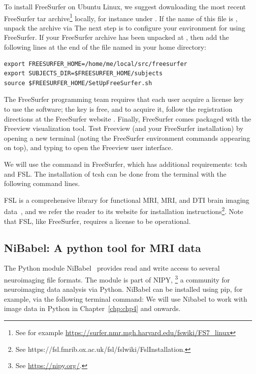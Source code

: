 To install FreeSurfer on Ubuntu Linux, we suggest downloading the most
recent FreeSurfer tar archive\footnote{See for example \url{https://surfer.nmr.mgh.harvard.edu/fswiki/FS7\_linux}}
locally, for instance under . If the name of this
file is , unpack the archive via
\noindent The next step is to configure your environment for using
FreeSurfer. If your FreeSurfer archive has been unpacked at
, then add the following lines
at the end of the file named  in your home
directory:
\begin{lstlisting}[style=bashStyle]
export FREESURFER_HOME=/home/me/local/src/freesurfer 
export SUBJECTS_DIR=$FREESURFER_HOME/subjects 
source $FREESURFER_HOME/SetUpFreeSurfer.sh
\end{lstlisting}

\noindent The {FreeSurfer} programming team requires that each user
acquire a license key to use the software; the key is free,
and to acquire it, follow the registration directions at the FreeSurfer
website \cite{freesurfer}. Finally, FreeSurfer comes packaged
with the Freeview visualization tool. Test Freeview (and your
FreeSurfer installation) by opening a new terminal (noting the
FreeSurfer environment commands appearing on top), and typing
\noindent to open the Freeview user interface.

We will use the command  in FreeSurfer, which has
additional requirements: tcsh and FSL. The installation of tcsh can be
done from the terminal with the following command lines.

FSL is a comprehensive library for functional MRI, MRI, and DTI brain imaging
data~\cite{jenkinson2012fsl}, and we refer the reader to its website for
installation
instructions\footnote{See https://fsl.fmrib.ox.ac.uk/fsl/fslwiki/FslInstallation.}. Note
that FSL, like FreeSurfer, requires a license to be operational.

\subsection{NiBabel: A python tool for MRI data}
\label{sec:chp2:tools:nibabel-numpy}

The Python module NiBabel~\cite{brett_matthew_2020_4295521} provides read and write
access to several neuroimaging file formats. The module is part of
NIPY, \footnote{See \url{https://nipy.org/}.} a community for neuroimaging
data analysis via Python. NiBabel can be installed using pip, for example, via the  
following terminal command:
\noindent We will use Nibabel to work with image data in Python in 
Chapter~\ref{chp:chp4} and onwards.

